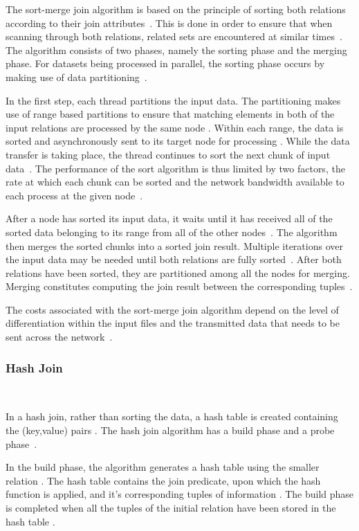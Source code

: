 \documentclass[12pt,twocolumn]{witseiepaper}
\begin{document}
The sort-merge join algorithm is based on the principle of sorting both relations according to their join attributes~\cite{thomas_zurek_optimisation_1997}. This is done in order to ensure that when scanning through both relations, related sets are encountered at similar times~\cite{thomas_zurek_optimisation_1997}. The algorithm consists of two phases, namely the sorting phase and the merging phase. For datasets being processed in parallel, the sorting phase occurs by making use of data partitioning~\cite{dist}.

In the first step, each thread partitions the input data. The partitioning makes use of range based partitions to ensure that matching elements in both of the input relations are processed by the same node \cite{dist}. Within each range, the data is sorted and asynchronously sent to its target node for processing \cite{dist}. While the data transfer is taking place, the thread continues to sort the next chunk of input data~\cite{dist}. The performance of the sort algorithm is thus limited by two factors, the rate at which each chunk can be sorted and the network bandwidth available to each process at the given node~\cite{dist}.

After a node has sorted its input data, it waits until it has received all of the sorted data belonging to its range from all of the other nodes~\cite{dist}. The algorithm then merges the sorted chunks into a sorted join result. Multiple iterations over the input data may be needed until both relations are fully sorted~\cite{dist}. After both relations have been sorted, they are partitioned among all the nodes for merging. Merging constitutes computing the join result between the corresponding tuples~\cite{dist}.

The costs associated with the sort-merge join algorithm depend on the level of differentiation within the input files and the transmitted data that needs to be sent across the network~\cite{dist}.

\subsubsection{Hash Join}$    $

In a hash join, rather than sorting the data, a hash table is created containing the (key,value) pairs \cite{thomas_zurek_optimisation_1997}. The hash join algorithm has a build phase and a probe phase~\cite{equijoin}. 

In the build phase, the algorithm generates a hash table using the smaller relation \cite{evaluating4JoinAlgorithms}. The hash table contains the join predicate, upon which the hash function is applied, and it's corresponding tuples of information \cite{thomas_zurek_optimisation_1997, evaluating4JoinAlgorithms}. The build phase is completed when all the tuples of the initial relation have been stored in the hash table \cite{thomas_zurek_optimisation_1997}. 
\end{document}
